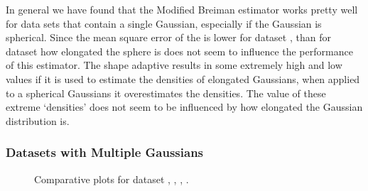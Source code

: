 		In general we have found that the Modified Breiman estimator works pretty well for data sets that contain a single Gaussian, especially if the Gaussian is spherical. Since the mean square error of the \mbe is lower for dataset \baakmanFive, than for dataset \baakmanFour how elongated the sphere is does not seem to influence the performance of this estimator. 
		The shape adaptive \mbe results in some extremely high and low values if it is used to estimate the densities of elongated Gaussians, when applied to a spherical Gaussians it overestimates the densities. The value of these extreme `densities' does not seem to be influenced by how elongated the Gaussian distribution is. 

\subsubsection{Datasets with Multiple Gaussians}
	\label{s:results:plots:multipleGaussians}

	\begin{figure*}
		\centering
		
		\caption{Comparative plots for dataset \ferdosiTwo, \ferdosiThree, \baakmanTwo, \baakmanThree.}
		\label{fig:4:resuts:multiSphere}
	\end{figure*}


